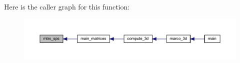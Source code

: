 Here is the caller graph for this function\+:
\nopagebreak
\begin{figure}[H]
\begin{center}
\leavevmode
\includegraphics[width=350pt]{Marco_8f90_a34ea4787df30b5632f6a1785977f2402_icgraph}
\end{center}
\end{figure}
\mbox{\label{Marco_8f90_aefe021b6f1e5d06c1e5f731ef776542d}} 
